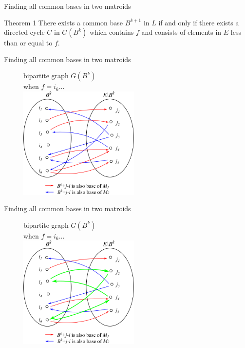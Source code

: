 \documentclass[11pt,xcolor=dvipsnames,table,dvipdfmx]{beamer}
\begin{document}
\begin{frame}{Finding all common bases in two matroids}
 \begin{block}{Theorem 1}
  There exists a common base $B^{k+1}$ in $L$ if and only if there exists a directed cycle $C$ in $G(B^k)$ which contains $f$ and consists of elements in $E$ less than or equal to $f$.
 \end{block}
\end{frame}

\begin{frame}{Finding all common bases in two matroids}
 \begin{figure}
  bipartite graph $G(B^k)$\\
  when $f = i_6$...\vspace{0.52cm}\\
  \centering
  \includegraphics[width=6cm]{text8631-16-2-7.png}
 \end{figure}
\end{frame}

\begin{frame}{Finding all common bases in two matroids}
 \begin{figure}
  bipartite graph $G(B^k)$\\
  when $f = i_6$...\vspace{0.52cm}\\
  \centering
  \includegraphics[width=6cm]{text8631-16-2-8.png}\\
 \end{figure}
\end{frame}
\end{document}
